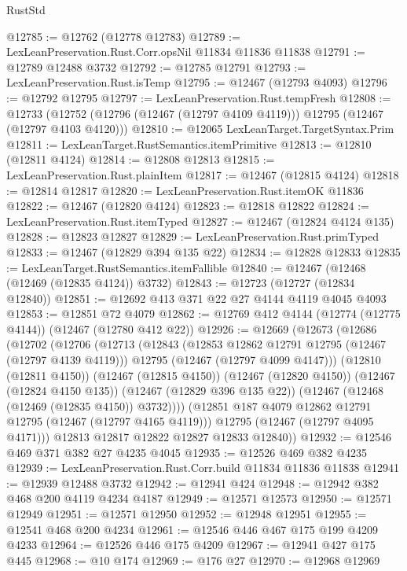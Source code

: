 \begin{lexlean}{RustStd}
\begin{coremodule}
@12785 := @12762 (@12778 @12783)
@12789 := LexLeanPreservation.Rust.Corr.opsNil @11834 @11836 @11838
@12791 := @12789 @12488 @3732
@12792 := @12785 @12791
@12793 := LexLeanPreservation.Rust.isTemp
@12795 := @12467 (@12793 @4093)
@12796 := @12792 @12795
@12797 := LexLeanPreservation.Rust.tempFresh
@12808 := @12733
    (@12752 (@12796 (@12467 (@12797 @4109 @4119))) @12795 (@12467 (@12797 @4103 @4120)))
@12810 := @12065 LexLeanTarget.TargetSyntax.Prim
@12811 := LexLeanTarget.RustSemantics.itemPrimitive
@12813 := @12810 (@12811 @4124)
@12814 := @12808 @12813
@12815 := LexLeanPreservation.Rust.plainItem
@12817 := @12467 (@12815 @4124)
@12818 := @12814 @12817
@12820 := LexLeanPreservation.Rust.itemOK @11836
@12822 := @12467 (@12820 @4124)
@12823 := @12818 @12822
@12824 := LexLeanPreservation.Rust.itemTyped
@12827 := @12467 (@12824 @4124 @135)
@12828 := @12823 @12827
@12829 := LexLeanPreservation.Rust.primTyped
@12833 := @12467 (@12829 @394 @135 @22)
@12834 := @12828 @12833
@12835 := LexLeanTarget.RustSemantics.itemFallible
@12840 := @12467 (@12468 (@12469 (@12835 @4124)) @3732)
@12843 := @12723 (@12727 (@12834 @12840))
@12851 := @12692 @413 @371 @22 @27 @4144 @4119 @4045 @4093
@12853 := @12851 @72 @4079
@12862 := @12769 @412 @4144 (@12774 (@12775 @4144)) (@12467 (@12780 @412 @22))
@12926 := @12669
    (@12673
      (@12686
        (@12702
          (@12706
            (@12713
              (@12843
                (@12853 @12862 @12791 @12795 (@12467 (@12797 @4139 @4119)))
                @12795
                (@12467 (@12797 @4099 @4147)))
              (@12810 (@12811 @4150))
              (@12467 (@12815 @4150))
              (@12467 (@12820 @4150))
              (@12467 (@12824 @4150 @135))
              (@12467 (@12829 @396 @135 @22))
              (@12467 (@12468 (@12469 (@12835 @4150)) @3732))))
          (@12851 @187 @4079 @12862 @12791 @12795 (@12467 (@12797 @4165 @4119)))
          @12795
          (@12467 (@12797 @4095 @4171)))
        @12813
        @12817
        @12822
        @12827
        @12833
        @12840))
@12932 := @12546 @469 @371 @382 @27 @4235 @4045
@12935 := @12526 @469 @382 @4235
@12939 := LexLeanPreservation.Rust.Corr.build @11834 @11836 @11838
@12941 := @12939 @12488 @3732
@12942 := @12941 @424
@12948 := @12942 @382 @468 @200 @4119 @4234 @4187
@12949 := @12571 @12573
@12950 := @12571 @12949
@12951 := @12571 @12950
@12952 := @12948 @12951
@12955 := @12541 @468 @200 @4234
@12961 := @12546 @446 @467 @175 @199 @4209 @4233
@12964 := @12526 @446 @175 @4209
@12967 := @12941 @427 @175 @445
@12968 := @10 @174
@12969 := @176 @27
@12970 := @12968 @12969

\end{coremodule}
\end{lexlean}

